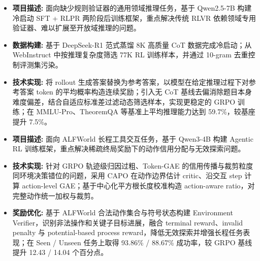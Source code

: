 \documentclass{resume}
\begin{document}
\begin{itemize}

  \item \textbf{项目描述:}
  面向缺少规则验证器的通用领域推理任务，基于 Qwen2.5-7B 构建冷启动 SFT + RLPR 两阶段后训练框架，重点解决传统 RLVR 依赖领域专用验证器、难以扩展至开放域推理的问题。

  \item \textbf{数据构建:}
  基于 DeepSeek-R1 范式蒸馏 8K 高质量 CoT 数据完成冷启动；从 WebInstruct 中按推理复杂度筛选 77K RL 训练样本，并通过 10-gram 去重控制评测集污染。

  \item \textbf{技术实现:}
  将 rollout 生成答案替换为参考答案，以模型在给定推理过程下对参考答案 token 的平均概率构造连续奖励；引入无 CoT 基线去偏消除题目本身难度偏差，结合自适应标准差过滤动态筛选样本，实现更稳定的 GRPO 训练；在 MMLU-Pro、TheoremQA 等基准上平均推理能力达到 59.7\%，较基座提升 7.5\%。
\end{itemize}


\vspace{-0.6em}
\begin{itemize}
  \item \textbf{项目描述:}
  面向 ALFWorld 长程工具交互任务，基于 Qwen3-4B 构建 Agentic RL 训练框架，重点解决稀疏终局奖励下的动作信用分配与无效探索问题。

  \item \textbf{技术实现:}
  针对 GRPO 轨迹级归因过粗、Token-GAE 的信用传播与裁剪粒度同环境决策错位的问题，采用 CAPO 在动作边界估计 critic、沿交互 step 计算 action-level GAE；基于中心化平方根长度校准构造 action-aware ratio，对完整动作统一加权与裁剪。

  \item \textbf{奖励优化:}
  基于 ALFWorld 合法动作集合与符号状态构建 Environment Verifier，识别非法操作和关键子目标进展，融合 terminal reward、invalid penalty 与 potential-based process reward，降低无效探索并增强长程任务表现；在 Seen / Unseen 任务上取得 93.86\% / 88.67\% 成功率，较 GRPO 基线提升 12.43 / 14.04 个百分点。
\end{itemize}
\end{document}
